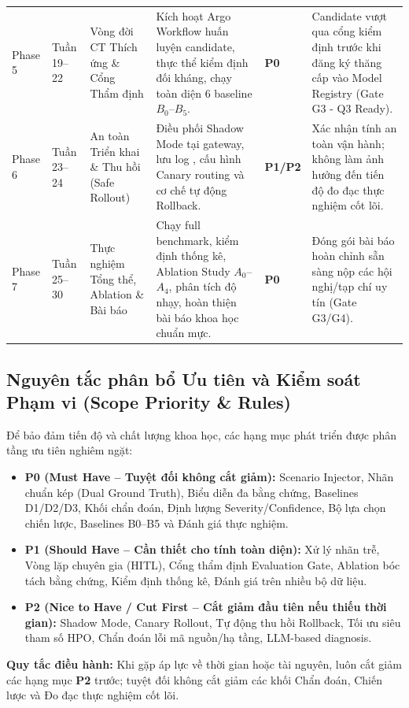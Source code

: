 \begin{xltabular}{\linewidth}{@{}L{1.6cm} L{1.8cm} L{3.6cm} L{4.4cm} C{1.4cm} Y@{}}
Phase 5 & Tuần 19--22 & Vòng đời CT Thích ứng \& Cổng Thẩm định & Kích hoạt Argo Workflow huấn luyện candidate, thực thể  kiểm định đối kháng, chạy toàn diện 6 baseline $B_0$--$B_5$. & \textbf{P0} & Candidate vượt qua cổng kiểm định trước khi đăng ký thăng cấp vào Model Registry (Gate G3 - Q3 Ready). \\
\addlinespace

Phase 6 & Tuần 23--24 & An toàn Triển khai \& Thu hồi (Safe Rollout) & Điều phối Shadow Mode tại gateway, lưu log , cấu hình Canary routing và cơ chế tự động Rollback. & \textbf{P1/P2} & Xác nhận tính an toàn vận hành; không làm ảnh hưởng đến tiến độ đo đạc thực nghiệm cốt lõi. \\
\addlinespace

Phase 7 & Tuần 25--30 & Thực nghiệm Tổng thể, Ablation \& Bài báo & Chạy full benchmark, kiểm định thống kê, Ablation Study $A_0$--$A_4$, phân tích độ nhạy, hoàn thiện bài báo khoa học chuẩn mực. & \textbf{P0} & Đóng gói bài báo hoàn chỉnh sẵn sàng nộp các hội nghị/tạp chí uy tín (Gate G3/G4). \\
\bottomrule
\end{xltabular}

\subsection{Nguyên tắc phân bổ Ưu tiên và Kiểm soát Phạm vi (Scope Priority \& Rules)}

Để bảo đảm tiến độ và chất lượng khoa học, các hạng mục phát triển được phân tầng ưu tiên nghiêm ngặt:
\begin{itemize}
  \item \textbf{P0 (Must Have -- Tuyệt đối không cắt giảm):} Scenario Injector, Nhãn chuẩn kép (Dual Ground Truth), Biểu diễn đa bằng chứng, Baselines D1/D2/D3, Khối chẩn đoán, Định lượng Severity/Confidence, Bộ lựa chọn chiến lược, Baselines B0--B5 và Đánh giá thực nghiệm.
  \item \textbf{P1 (Should Have -- Cần thiết cho tính toàn diện):} Xử lý nhãn trễ, Vòng lặp chuyên gia (HITL), Cổng thẩm định Evaluation Gate, Ablation bóc tách bằng chứng, Kiểm định thống kê, Đánh giá trên nhiều bộ dữ liệu.
  \item \textbf{P2 (Nice to Have / Cut First -- Cắt giảm đầu tiên nếu thiếu thời gian):} Shadow Mode, Canary Rollout, Tự động thu hồi Rollback, Tối ưu siêu tham số HPO, Chẩn đoán lỗi mã nguồn/hạ tầng, LLM-based diagnosis.
\end{itemize}

\textbf{Quy tắc điều hành:} Khi gặp áp lực về thời gian hoặc tài nguyên, luôn cắt giảm các hạng mục \textbf{P2} trước; tuyệt đối không cắt giảm các khối Chẩn đoán, Chiến lược và Đo đạc thực nghiệm cốt lõi.
